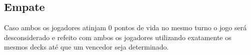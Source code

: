 \subsection{Empate}

Caso ambos os jogadores atinjam 0 pontos de vida no mesmo turno o jogo será desconsiderado e refeito com ambos os jogadores utilizando exatamente os mesmos decks até que um vencedor seja determinado.